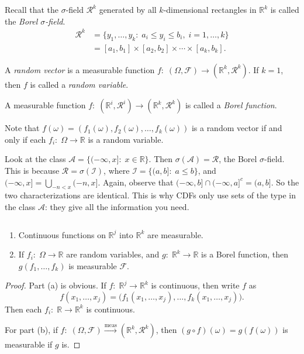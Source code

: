 \documentclass[11pt,fleqn]{book} %
\begin{document}
Recall that the $\sigma$-field $\mathcal{R}^k$ generated by all $k$-dimensional rectangles in $\mathbb{R}^k$ is called the \emph{Borel $\sigma$-field}.
\begin{align*}
	\mathcal{R}^k &= \{y_1,\dots,y_k:\;a_i \leq y_i \leq b_i,\;i=1,\dots,k\} \\
	&= [a_1,b_1] \times [a_2,b_2] \times \cdots \times [a_k,b_k].
\end{align*}

\begin{definition} \label{def:random-vector}
	A \emph{random vector} is a measurable function $f:\;(\Omega,\mathcal{F}) \to (\mathbb{R}^k,\mathcal{R}^k)$. If $k=1$, then $f$ is called a \emph{random variable}.
\end{definition}

A measurable function $f:\;(\mathbb{R}^i,\mathcal{R}^i) \to (\mathbb{R}^k,\mathcal{R}^k)$ is called a \emph{Borel function}.

Note that $f(\omega) = (f_1(\omega),f_2(\omega),\dots,f_k(\omega))$ is a random vector if and only if each $f_i:\;\Omega \to \mathbb{R}$ is a random variable.

Look at the class $\mathcal{A} = \{(-\infty,x]:\;x \in \mathbb{R}\}$. Then $\sigma(\mathcal{A}) = \mathcal{R}$, the Borel $\sigma$-field. This is because $\mathcal{R} = \sigma(\mathcal{I})$, where $\mathcal{I} = \{(a,b]:\;a \leq b\}$, and $(-\infty,x] = \bigcup_{-n<x} (-n,x]$. Again, observe that $(-\infty,b] \cap (-\infty,a]^c = (a,b]$. So the two characterizations are identical. This is why CDFs only use sets of the type in the class $\mathcal{A}$: they give all the information you need.

\begin{theorem} \label{thm:measurable-real-functions}
	$ $
	\begin{enumerate}[label=(\alph*)]
		\item Continuous functions on $\mathbb{R}^j$ into $\mathbb{R}^k$ are measurable.
		\item If $f_i:\;\Omega \to \mathbb{R}$ are random variables, and $g:\;\mathbb{R}^k \to \mathbb{R}$ is a Borel function, then $g(f_1,\dots,f_k)$ is measurable $\mathcal{F}$.
	\end{enumerate}
\end{theorem}

\begin{proof}
	Part (a) is obvious. If $f:\;\mathbb{R}^j \to \mathbb{R}^k$ is continuous, then write $f$ as
	\[
		f(x_1,\dots,x_j) = \big( f_1(x_1,\dots,x_j), \dots, f_k(x_1,\dots,x_j) \big).
	\]
	Then each $f_i:\;\mathbb{R} \to \mathbb{R}^k$ is continuous.

	For part (b), if $f:\;(\Omega,\mathcal{F}) \xrightarrow{\textrm{meas}} (\mathbb{R}^k,\mathcal{R}^k)$, then $(g \circ f)(\omega) = g(f(\omega))$ is measurable if $g$ is.
\end{proof}
\end{document}
